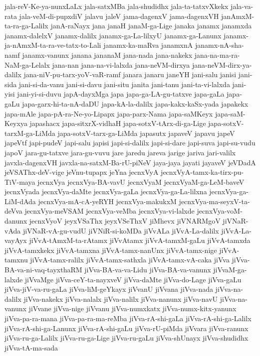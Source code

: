 {jala-reV-Ke-ya-nunxLaLx
jala-satxMBa
jala-shudidhx
jala-ta-tatxvXkekx
jala-va-rata
jala-veM-di-pupxdiV
jalavu
jaleV
jama-dagenxV
jama-dagenxVH
janAmxM-ta-ra-ga-Lalilx
janA-raNayx
jana
janaH
janaM-ga-Lige
janaka
janamx
janamxda
janamx-dalelxV
janamx-dalilx
janamx-ga-La-lilxyU
janamx-ga-Lanunx
janamx-ja-nAmxM-ta-ra-ve-tatx-to-Lali
janamx-ka-maRva
janamxnA
janamx-nA-sha-namf
janamx-vanunx
janana
jananaM
jana-nada
jana-nakekx
jana-na-ma-ra-NaM-ga-Lelalx
jana-nan
jana-na-vi-lalxda
jana-neVM-dirxya
jana-neVM-dirx-ya-dalilx
jana-niV-pu-tarx-yoV-vaR-ramf
janara
janaru
janeYH
jani-salu
janisi
jani-sida
jani-si-da-vanu
jani-si-davu
jani-situ
janita
jani-tanu
jani-ta-vi-lalxda
jani-yisi
jani-yi-si-duvu
japA-dayxMga
japa
japa-ga-LA-gu-tatxve
japa-gaLa
japa-gaLu
japa-garx-hi-ta-nA-daDU
japa-kA-la-dalilx
japa-kakx-kaSx-yada
japakekx
japa-mAle
japa-pA-ra-Ne-yo-Lipapx
japa-parx-Nama
japa-saMKeyx
japa-saM-Keyxya
japashacx
japa-sitxrX-vidhaH
japa-sotxV-tArx-di-ga-Lige
japa-sotxV-tarxM-ga-LiMda
japa-sotxV-tarx-ga-LiMda
japasutx
japaveV
japavu
japeV
japeVtf
japi-pudeV
japi-salu
japisi
japi-si-dalilx
japi-si-dare
japi-suva
japi-su-vudu
japoV
jara-gu-tatxve
jara-gu-vuvu
jare
jaredu
jareva
jarige
jariva
jari-valilx
javxla-dagenxVH
javxla-na-satxM-Ba-rU-piNeV
jaya-jaya
jayati
jayaveV
jeVDadA
jeVSAThx-deV-vige
jeVnu-tupapx
jeYna
jecnxVyA
jecnxVyA-tamx-ka-tirx-pu-TiV-maya
jecnxVya
jecnxVya-BA-vavU
jecnxVyaM
jecnxVyaM-ga-LeM-baveV
jecnxVyada
jecnxVya-daMte
jecnxVya-gaLa
jecnxVya-ga-La-lilxna
jecnxVya-ga-LiM-dAda
jecnxVya-mA-cA-yeRYH
jecnxVya-makukxM
jecnxVya-ma-seyxV-ta-deVva
jecnxVya-meVSAM
jecnxVya-veMba
jecnxVya-vi-lalxde
jecnxVya-voM-danunx
jecnxVyoV
jeyxVSaThx
jeyxVSeThxV
jiMhevx
jiVNARMgoV
jiVNaR-vAda
jiVNaR-vA-gu-vudU
jiVNiR-si-koMDa
jiVvALa
jiVvA-La-dalilx
jiVvA-La-vayAyx
jiVvA-tAmxM-ta-rAtamx
jiVvAtamx
jiVvA-tamxM-gaLu
jiVvA-tamxda
jiVvA-tamxkekx
jiVvA-tamxna
jiVvA-tamx-nanUnx
jiVvA-tamx-nige
jiVvA-tamxnu
jiVvA-tamx-ralilx
jiVvA-tamx-sathxla
jiVvA-tamx-vA-caka
jiVva
jiVva-BA-va-ni-vaq-tayxthaRM
jiVva-BA-va-va-Lidu
jiVva-BA-va-vanunx
jiVvaM-ga-lalxde
jiVvaMge
jiVva-ceY-ta-nayxveV
jiVva-daMte
jiVva-do-Lage
jiVva-gaLu
jiVva-jiV-va-ru-gaLa
jiVva-liM-geYkayx
jiVvanU
jiVvana
jiVva-nada
jiVva-na-dalilx
jiVva-nakekx
jiVva-nalalx
jiVva-nalilx
jiVva-nanunx
jiVva-navU
jiVva-na-vanunx
jiVvane
jiVva-nige
jiVvanu
jiVva-numxkatx
jiVva-numx-kitx-yanunx
jiVva-pa-ra-mana
jiVva-pa-ra-ma-reMba
jiVva-rA-shi-gaLa
jiVva-rA-shi-ga-Lalilx
jiVva-rA-shi-ga-Lanunx
jiVva-rA-shi-gaLu
jiVva-rU-piMda
jiVvara
jiVva-ranunx
jiVva-ru-ga-Lalilx
jiVva-ru-ga-Lige
jiVva-ru-gaLu
jiVva-shUnayx
jiVva-shudidhx
jiVva-tA-ma-sada
}
